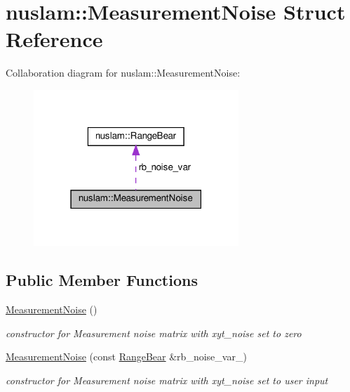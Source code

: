 \hypertarget{structnuslam_1_1MeasurementNoise}{}\section{nuslam\+:\+:Measurement\+Noise Struct Reference}
\label{structnuslam_1_1MeasurementNoise}


Collaboration diagram for nuslam\+:\+:Measurement\+Noise\+:\nopagebreak
\begin{figure}[H]
\begin{center}
\leavevmode
\includegraphics[width=219pt]{d8/de3/structnuslam_1_1MeasurementNoise__coll__graph}
\end{center}
\end{figure}
\subsection*{Public Member Functions}
\begin{DoxyCompactItemize}
\item 
\mbox{\label{structnuslam_1_1MeasurementNoise_acad5ae4aedf60cfa75b7aa4432964010}} 
\hyperlink{structnuslam_1_1MeasurementNoise_acad5ae4aedf60cfa75b7aa4432964010}{Measurement\+Noise} ()
\begin{DoxyCompactList}\small\item\em constructor for Measurement noise matrix with xyt\+\_\+noise set to zero \end{DoxyCompactList}\item 
\mbox{\label{structnuslam_1_1MeasurementNoise_abfbe4352cca0d9e8416142ce442f207e}} 
\hyperlink{structnuslam_1_1MeasurementNoise_abfbe4352cca0d9e8416142ce442f207e}{Measurement\+Noise} (const \hyperlink{structnuslam_1_1RangeBear}{Range\+Bear} \&rb\+\_\+noise\+\_\+var\+\_\+)
\begin{DoxyCompactList}\small\item\em constructor for Measurement noise matrix with xyt\+\_\+noise set to user input \end{DoxyCompactList}\end{DoxyCompactItemize}
